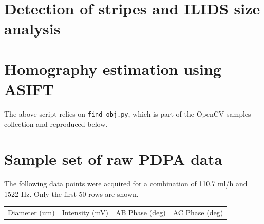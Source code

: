 \documentclass[11.5pt,oneside]{book}
\begin{document}
\section*{Detection of stripes and ILIDS size analysis}

\pagebreak
{}
\section*{Homography estimation using ASIFT}

The above script relies on \texttt{find\_obj.py}, which is part of the OpenCV
samples collection and reproduced below.

\pagebreak

\section*{Sample set of raw PDPA data}
The following data points were acquired for a combination of 110.7 ml/h and 1522
Hz. Only the first 50 rows are shown.

\begin{longtable}{r r r r}
        \centering
Diameter (um)&Intensity (mV)&AB Phase (deg)&AC Phase (deg)\\
        
\end{longtable}
\end{document}
